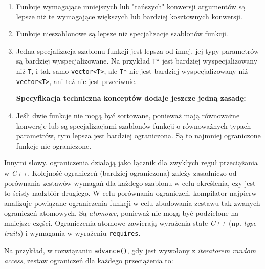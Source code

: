 \documentclass[11pt, a4paper]{article}
\begin{document}
\begin{enumerate}
\item Funkcje wymagające mniejszych lub "tańszych" konwersji argumentów są lepsze niż te wymagające większych lub bardziej kosztownych konwersji.

\item Funkcje nieszablonowe są lepsze niż specjalizacje szablonów funkcji.

\item Jedna specjalizacja szablonu funkcji jest lepsza od innej, jej typy parametrów są bardziej wyspecjalizowane. Na przykład \verb#T*# jest bardziej wyspecjalizowany niż \verb#T#, i tak samo \verb#vector<T>#, ale \verb#T*# nie jest bardziej wyspecjalizowany niż \verb#vector<T>#, ani też nie jest przeciwnie.

\textbf{Specyfikacja techniczna konceptów dodaje jeszcze jedną zasadę:}

\item Jeśli dwie funkcje nie mogą być sortowane, ponieważ mają równoważne konwersje lub są specjalizacjami szablonów funkcji o równoważnych typach parametrów, tym lepsza jest bardziej ograniczona. Są to najmniej ograniczone funkcje nie ograniczone. 

\end{enumerate}

Innymi słowy, ograniczenia działają jako łącznik dla zwykłych reguł przeciążania w \emph{C++}. Kolejność ograniczeń (bardziej ograniczona) zależy zasadniczo od porównania zestawów wymagań dla każdego szablonu w celu określenia, czy jest to ścisły nadzbiór drugiego. W celu porównania ograniczeń, kompilator najpierw analizuje powiązane ograniczenia funkcji w celu zbudowania zestawu tak zwanych ograniczeń atomowych. Są \emph{atomowe}, ponieważ nie mogą być podzielone na mniejsze części. Ograniczenia atomowe zawierają wyrażenia stałe \emph{C++} (np. \emph{type traits}) i wymagania w wyrażeniu \verb#requires#.

Na przykład, w rozwiązaniu \verb#advance()#, gdy jest wywołany z \emph{iteratorem random access}, zestaw ograniczeń dla każdego przeciążenia to:
\end{document}

